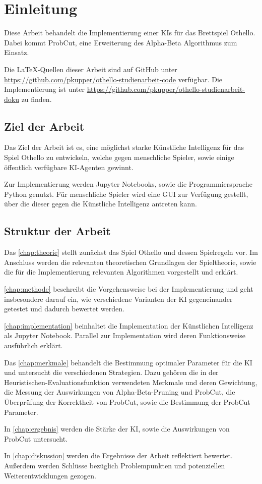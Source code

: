 
\chapter{Einleitung}
\label{chap:einleitung}

Diese Arbeit behandelt die Implementierung einer \acp{KI} für das Brettspiel Othello. Dabei kommt
ProbCut\cite[S.~1]{probcut}, eine Erweiterung des Alpha-Beta Algorithmus zum Einsatz.

Die \LaTeX-Quellen dieser Arbeit sind auf GitHub unter \url{https://github.com/pkupper/othello-studienarbeit-code}
verfügbar. Die Implementierung ist unter \url{https://github.com/pkupper/othello-studienarbeit-doku} zu finden.

\section{Ziel der Arbeit}
\label{sec:goal}

Das Ziel der Arbeit ist es, eine möglichst starke Künstliche Intelligenz für das Spiel Othello zu entwickeln, welche
gegen menschliche Spieler, sowie einige öffentlich verfügbare \ac{KI}-Agenten gewinnt.

Zur Implementierung werden Jupyter Notebooks, sowie die Programmiersprache Python genutzt.
Für menschliche Spieler wird eine \ac{GUI} zur Verfügung gestellt, über
die dieser gegen die Künstliche Intelligenz antreten kann.

\section{Struktur der Arbeit}
Das \autoref{chap:theorie} stellt zunächst das Spiel Othello und dessen Spielregeln vor. Im Anschluss werden die
relevanten theoretischen Grundlagen der Spieltheorie, sowie die für die Implementierung relevanten Algorithmen
vorgestellt und erklärt.

\autoref{chap:methode} beschreibt die Vorgehensweise bei der Implementierung und geht insbesondere darauf ein, wie
verschiedene Varianten der \ac{KI} gegeneinander getestet und dadurch bewertet werden.

\autoref{chap:implementation} beinhaltet die Implementation der Künstlichen Intelligenz als Jupyter Notebook. Parallel
zur Implementation wird deren Funktionsweise ausführlich erklärt.

Das \autoref{chap:merkmale} behandelt die Bestimmung optimaler Parameter für die \ac{KI} und untersucht die
verschiedenen Strategien. Dazu gehören die in der Heuristischen-Evaluationsfunktion verwendeten Merkmale und deren
Gewichtung, die Messung der Auswirkungen von Alpha-Beta-Pruning und ProbCut, die Überprüfung der Korrektheit von
ProbCut, sowie die Bestimmung der ProbCut Parameter.

In \autoref{chap:ergebnis} werden die Stärke der \ac{KI}, sowie die Auswirkungen von ProbCut untersucht.

In \autoref{chap:diskussion} werden die Ergebnisse der Arbeit reflektiert bewertet. Außerdem werden Schlüsse bezüglich
Problempunkten und potenziellen Weiterentwicklungen gezogen.